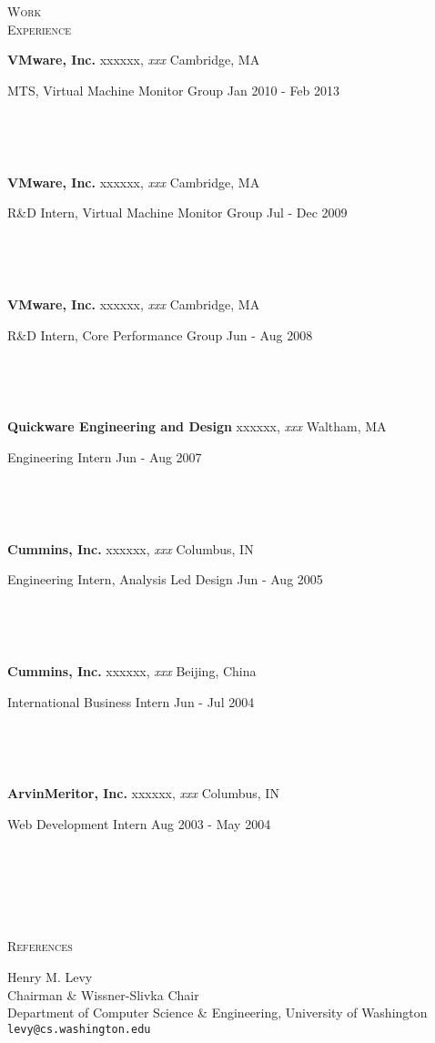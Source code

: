 \documentclass[10pt,times]{report}
\newlength{\sectiongap}
\newlength{\entrygap}
\newlength{\sectioncolwidth}
\newlength{\colgap}
\newlength{\stuffwidth}
\def\ifEqString#1#2{\def\testa{#1}\def\testb{#2}%
  \ifx\testa\testb}
\newenvironment{rtable}{
  \begin{minipage}{\textwidth}
  }{
  \end{minipage}
}
\newenvironment{rentry}[3][xxx]{
  \begin{minipage}[t]{\hsize}
    \textbf{#2}\ifEqString{#1}{xxx}\relax\else, \textit{#1}\fi
    \hspace{\stretch{1}} #3 \\
  }{
    \removelastskip
  \end{minipage}
  \\[\entrygap]  %
}
\newcommand{\rline}[2]{
  \begin{minipage}[t]{\hsize}
    #1 \hspace{\stretch{1}} #2
  \end{minipage} \\
}
\newenvironment{rsection}[1]{
  \begin{minipage}[t]{\sectioncolwidth}
    \textsc{#1}
  \end{minipage}
  \hspace{\colgap}
  \begin{minipage}[t]{\stuffwidth}
  }{
    \removelastskip
  \end{minipage}
  \\[\sectiongap]
}
\begin{document}
\begin{rtable}
  \begin{rsection}{Work\\Experience}
    \begin{rentry}{VMware, Inc.}{Cambridge, MA}      
      \rline{MTS, Virtual Machine Monitor
        Group}{Jan 2010 - Feb 2013}
      \vspace{-.5em}
    \end{rentry}
    \begin{rentry}{VMware, Inc.}{Cambridge, MA}      
      \rline{R\&D Intern, Virtual Machine Monitor Group}{Jul - Dec 2009}
      \vspace{-.5em}
    \end{rentry}
    \begin{rentry}{VMware, Inc.}{Cambridge, MA}      
      \rline{R\&D Intern, Core Performance Group}{Jun - Aug 2008}
      \vspace{-.5em}
    \end{rentry}
    \begin{rentry}{Quickware Engineering and Design}{Waltham, MA}
      \rline{Engineering Intern}{Jun - Aug 2007} 
      \vspace{-.5em}
    \end{rentry}
    \begin{rentry}{Cummins, Inc.}{Columbus, IN}
      \rline{Engineering Intern, Analysis Led Design}{Jun - Aug 2005}
      \vspace{-.5em}
    \end{rentry}
    \begin{rentry}{Cummins, Inc.}{Beijing, China}
      \rline{International Business Intern}{Jun - Jul 2004} 
      \vspace{-.5em}
    \end{rentry}
    \begin{rentry}{ArvinMeritor, Inc.}{Columbus, IN}
      \rline{Web Development Intern}{Aug 2003 - May 2004}
      \vspace{-.5em}
    \end{rentry}
  \end{rsection}

  \begin{rsection}{References}
    Henry M. Levy\\
    Chairman \& Wissner-Slivka Chair\\
    Department of Computer Science \& Engineering, University of Washington\\
    \texttt{levy@cs.washington.edu}\\
    \vspace{-.5em}
    

\end{rsection}
\end{rtable}
\end{document}
